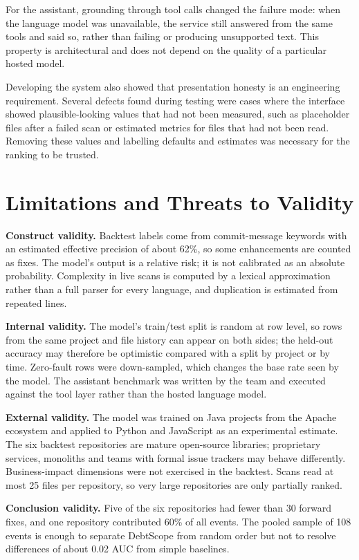 \documentclass[conference]{IEEEtran}
\begin{document}
For the assistant, grounding through tool calls changed the failure mode: when the language model was unavailable, the service still answered from the same tools and said so, rather than failing or producing unsupported text. This property is architectural and does not depend on the quality of a particular hosted model.

Developing the system also showed that presentation honesty is an engineering requirement. Several defects found during testing were cases where the interface showed plausible-looking values that had not been measured, such as placeholder files after a failed scan or estimated metrics for files that had not been read. Removing these values and labelling defaults and estimates was necessary for the ranking to be trusted.

\section{Limitations and Threats to Validity}
\textbf{Construct validity.} Backtest labels come from commit-message keywords with an estimated effective precision of about 62\%, so some enhancements are counted as fixes. The model's output is a relative risk; it is not calibrated as an absolute probability. Complexity in live scans is computed by a lexical approximation rather than a full parser for every language, and duplication is estimated from repeated lines.

\textbf{Internal validity.} The model's train/test split is random at row level, so rows from the same project and file history can appear on both sides; the held-out accuracy may therefore be optimistic compared with a split by project or by time. Zero-fault rows were down-sampled, which changes the base rate seen by the model. The assistant benchmark was written by the team and executed against the tool layer rather than the hosted language model.

\textbf{External validity.} The model was trained on Java projects from the Apache ecosystem and applied to Python and JavaScript as an experimental estimate. The six backtest repositories are mature open-source libraries; proprietary services, monoliths and teams with formal issue trackers may behave differently. Business-impact dimensions were not exercised in the backtest. Scans read at most 25 files per repository, so very large repositories are only partially ranked.

\textbf{Conclusion validity.} Five of the six repositories had fewer than 30 forward fixes, and one repository contributed 60\% of all events. The pooled sample of 108 events is enough to separate DebtScope from random order but not to resolve differences of about 0.02 AUC from simple baselines.
\end{document}
